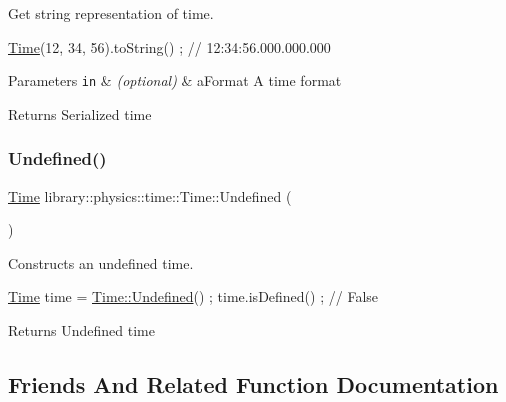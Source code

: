 Get string representation of time. 


\begin{DoxyCode}
\hyperlink{classlibrary_1_1physics_1_1time_1_1_time_a46a4b9be1451041ae65332f04db21c4b}{Time}(12, 34, 56).toString() ; \textcolor{comment}{// 12:34:56.000.000.000}
\end{DoxyCode}



\begin{DoxyParams}[1]{Parameters}
\mbox{\tt in}  & {\em (optional)} & a\+Format A time format \\
\hline
\end{DoxyParams}
\begin{DoxyReturn}{Returns}
Serialized time 
\end{DoxyReturn}
\mbox{\label{classlibrary_1_1physics_1_1time_1_1_time_a6e8c7e4ea2d05a7c0a9e5e045ef45520}} 
\subsubsection{\texorpdfstring{Undefined()}{Undefined()}}
{\footnotesize\ttfamily \hyperlink{classlibrary_1_1physics_1_1time_1_1_time}{Time} library\+::physics\+::time\+::\+Time\+::\+Undefined (\begin{DoxyParamCaption}{ }\end{DoxyParamCaption})\hspace{0.3cm}{\ttfamily [static]}}



Constructs an undefined time. 


\begin{DoxyCode}
\hyperlink{classlibrary_1_1physics_1_1time_1_1_time_a46a4b9be1451041ae65332f04db21c4b}{Time} time = \hyperlink{classlibrary_1_1physics_1_1time_1_1_time_a6e8c7e4ea2d05a7c0a9e5e045ef45520}{Time::Undefined}() ;
time.isDefined() ; \textcolor{comment}{// False}
\end{DoxyCode}


\begin{DoxyReturn}{Returns}
Undefined time 
\end{DoxyReturn}


\subsection{Friends And Related Function Documentation}
\mbox{\label{classlibrary_1_1physics_1_1time_1_1_time_a181948621d8fe0d85bdfc97af30b62fb}} 

